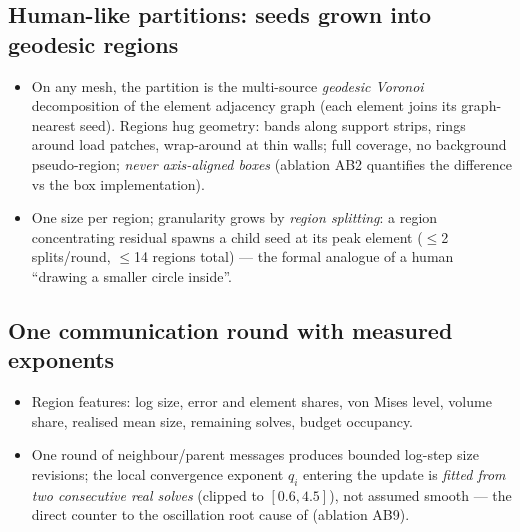 \documentclass[preprint,12pt]{elsarticle}
\newenvironment{plan}{\begin{itemize}\setlength\itemsep{0.15em}}{\end{itemize}}
\begin{document}
\subsection{Human-like partitions: seeds grown into geodesic regions}
\begin{plan}
  \item On any mesh, the partition is the multi-source \emph{geodesic Voronoi}
        decomposition of the element adjacency graph (each element joins its
        graph-nearest seed). Regions hug geometry: bands along support strips, rings
        around load patches, wrap-around at thin walls; full coverage, no background
        pseudo-region; \emph{never axis-aligned boxes} (ablation AB2 quantifies the
        difference vs the box implementation).
  \item One size per region; granularity grows by \emph{region splitting}: a region
        concentrating residual spawns a child seed at its peak element
        ($\le$2 splits/round, $\le$14 regions total) --- the formal analogue of a human
        ``drawing a smaller circle inside''.
\end{plan}

\subsection{One communication round with measured exponents}
\begin{plan}
  \item Region features: log size, error and element shares, von Mises level, volume
        share, realised mean size, remaining solves, budget occupancy.
  \item One round of neighbour/parent messages produces bounded log-step size
        revisions; the local convergence exponent $q_i$ entering the update is
        \emph{fitted from two consecutive real solves} (clipped to $[0.6,4.5]$), not
        assumed smooth --- the direct counter to the oscillation root cause of
        \cite{onate93} (ablation AB9).
\end{plan}
\end{document}
